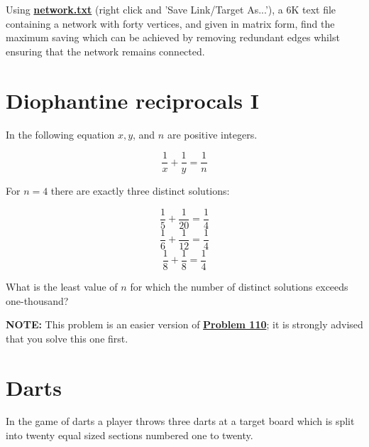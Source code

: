 Using \href{https://projecteuler.net/project/resources/p107_network.txt}{\textbf{network.txt}} (right click and 'Save Link/Target As...'), a 6K text file containing a network with forty vertices, and given in matrix form, find the maximum saving which can be achieved by removing redundant edges whilst ensuring that the network remains connected.


\newpage


\section{Diophantine reciprocals I} \label{pb.0108}

In the following equation $x, y$, and $n$ are positive integers.

$$\frac{1}{x} + \frac{1}{y} = \frac{1}{n}$$

For $n = 4$ there are exactly three distinct solutions:

$$\frac{1}{5} + \frac{1}{20} = \frac{1}{4}$$
$$\frac{1}{6} + \frac{1}{12} = \frac{1}{4}$$
$$\frac{1}{8} + \frac{1}{8} = \frac{1}{4}$$

What is the least value of $n$ for which the number of distinct solutions exceeds one-thousand?
\medskip

\textbf{NOTE:} This problem is an easier version of \hyperref[pb.0110]{\textbf{Problem 110}}; it is strongly advised that you solve this one first.


\section{Darts} \label{pb.0109}

In the game of darts a player throws three darts at a target board which is split into twenty equal sized sections numbered one to twenty.


\begin{center}
\end{center}

